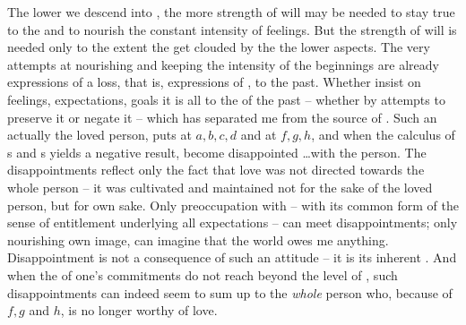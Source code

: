 The lower we descend into , the more strength of will may be
needed to stay true to the  and to nourish the constant
intensity of feelings.  But the strength of will is needed only to the extent
the  get clouded by the the lower aspects.
The very attempts at nourishing and keeping the intensity of the beginnings are
already expressions of a loss, that is, expressions of , 
 to the past. Whether  insist on  feelings, 
expectations,  goals it is all  to the  of
the past -- whether by attempts to preserve it or negate it -- which has
separated me from the  source of .  Such an
 actually  the loved person, puts  \thi{+} at
$a,b,c,d$ and \thi{--} at $f,g,h$, and when the calculus of \thi{+}s and
\thi{--}s yields a negative result,  become disappointed \ldots with the
person. The disappointments reflect only the fact that  love was not
directed towards the whole person -- it was cultivated and maintained not for
the sake of the loved person, but for  own sake. Only preoccupation with  -- with its
common form of the sense of entitlement underlying all expectations -- can
meet disappointments; only nourishing  own image, can  imagine that
the world owes me anything. Disappointment is not a consequence of such an
attitude -- it is its inherent . And when the  of one's
commitments do not reach beyond the level of , such disappointments
can indeed seem to sum up to the {\em whole} person who, because of $f,g$ and
$h$, is no longer worthy of  love. 

